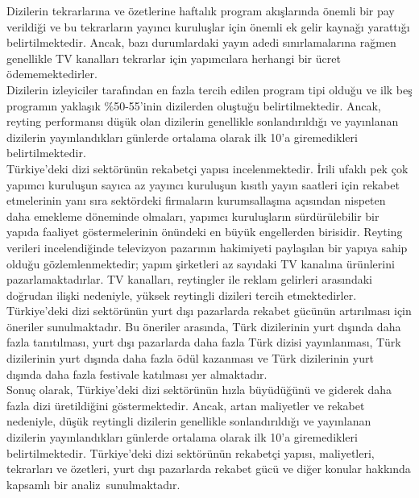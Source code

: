 \indent Dizilerin tekrarlarına ve özetlerine haftalık program akışlarında önemli bir pay verildiği ve bu tekrarların yayıncı kuruluşlar için önemli ek gelir kaynağı yarattığı belirtilmektedir. Ancak, bazı durumlardaki yayın adedi sınırlamalarına rağmen genellikle TV kanalları tekrarlar için yapımcılara herhangi bir ücret ödememektedirler. \\

\indent Dizilerin izleyiciler tarafından en fazla tercih edilen program tipi olduğu ve ilk beş programın yaklaşık \%50-55'inin dizilerden oluştuğu belirtilmektedir. Ancak, reyting performansı düşük olan dizilerin genellikle sonlandırıldığı ve yayınlanan dizilerin yayınlandıkları günlerde ortalama olarak ilk 10'a giremedikleri belirtilmektedir. \\

\indent Türkiye'deki dizi sektörünün rekabetçi yapısı incelenmektedir. İrili ufaklı pek çok yapımcı kuruluşun sayıca az yayıncı kuruluşun kısıtlı yayın saatleri için rekabet etmelerinin yanı sıra sektördeki firmaların kurumsallaşma açısından nispeten daha emekleme döneminde olmaları, yapımcı kuruluşların sürdürülebilir bir yapıda faaliyet göstermelerinin önündeki en büyük engellerden birisidir. Reyting verileri incelendiğinde televizyon pazarının hakimiyeti paylaşılan bir yapıya sahip olduğu gözlemlenmektedir; yapım şirketleri az sayıdaki TV kanalına ürünlerini pazarlamaktadırlar. TV kanalları, reytingler ile reklam gelirleri arasındaki doğrudan ilişki nedeniyle, yüksek reytingli dizileri tercih etmektedirler. \\

\indent Türkiye'deki dizi sektörünün yurt dışı pazarlarda rekabet gücünün artırılması için öneriler sunulmaktadır. Bu öneriler arasında, Türk dizilerinin yurt dışında daha fazla tanıtılması, yurt dışı pazarlarda daha fazla Türk dizisi yayınlanması, Türk dizilerinin yurt dışında daha fazla ödül kazanması ve Türk dizilerinin yurt dışında daha fazla festivale katılması yer almaktadır. \\

\indent Sonuç olarak, Türkiye'deki dizi sektörünün hızla büyüdüğünü ve giderek daha fazla dizi üretildiğini göstermektedir. Ancak, artan maliyetler ve rekabet nedeniyle, düşük reytingli dizilerin genellikle sonlandırıldığı ve yayınlanan dizilerin yayınlandıkları günlerde ortalama olarak ilk 10'a giremedikleri belirtilmektedir. Türkiye'deki dizi sektörünün rekabetçi yapısı, maliyetleri, tekrarları ve özetleri, yurt dışı pazarlarda rekabet gücü ve diğer konular hakkında kapsamlı bir analiz sunulmaktadır.